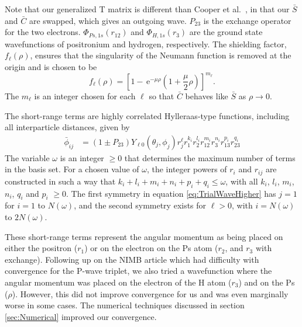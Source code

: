 \documentclass[preprint,showpacs,preprintnumbers,amsmath,amssymb]{revtex4}
\newcommand{\ee} {\,\text{e}}
\begin{document}
Note that our generalized T matrix is different than Cooper et al.\ \cite{Cooper2010}, in that our $\bar{S}$ and $\bar{C}$ are swapped, which gives an outgoing wave.  $P_{23}$ is the exchange operator for the two electrons. $\Phi_{Ps,1s}\left(r_{12}\right)$ and $\Phi_{H,1s}\left(r_3\right)$ are the ground state wavefunctions of positronium and hydrogen, respectively. The shielding factor, $f_\ell(\rho)$, ensures that the singularity of the Neumann function is removed at the origin and is chosen to be
\begin{equation}
f_\ell(\rho) = \left[1 - \ee^{-\mu \rho} \left(1+\frac{\mu}{2}\rho\right)\right]^{m_\ell}.
\label{eq:PartialWaveShielding}
\end{equation}
The $m_\ell$ is an integer chosen for each $\ell$ so that $\bar{C}$ behaves like $\bar{S}$ as $\rho \rightarrow 0$.

The short-range terms are highly correlated Hylleraas-type functions, including all interparticle distances, given by
\begin{subequations}
\label{eq:PhiDef}
\begin{align}
\bar{\phi}_{ij} &= \left(1 \pm P_{23}\right) Y_{\ell 0}(\theta_j,\phi_j) r_j^{\ell} r_1^{k_i} r_2^{l_i} r_{12}^{m_i} r_3^{n_i} r_{13}^{p_i} r_{23}^{q_i} \label{eq:PartialWavePhi}
\end{align}
\end{subequations}
The variable $\omega$ is an integer $\geq 0$ that determines the maximum number of terms in the basis set.  For a chosen value of $\omega$, the integer powers of $r_i$ and $r_{ij}$ are constructed in such a way that $k_i + l_i + m_i + n_i + p_i + q_i \leq \omega$, with all $k_i$, $l_i$, $m_i$, $n_i$, $q_i$ and $p_i$ $\geq 0$. The first symmetry in equation \ref{eq:TrialWaveHigher} has $j = 1$ for $i=1$ to $N(\omega)$, and the second symmetry exists for $\ell > 0$, with $i = N(\omega)$ to $2N(\omega)$.

These short-range terms represent the angular momentum as being placed on either the positron ($r_1$) or on the electron on the Ps atom ($r_2$, and $r_3$ with exchange).
Following up on the NIMB article \cite{VanReeth2004} which had difficulty with convergence for the P-wave triplet, we also tried a wavefunction where the angular momentum was placed on the electron of the H atom ($r_3$) and on the Ps ($\rho$). However, this did not improve convergence for us and was even marginally worse in some cases. The numerical techniques discussed in section \ref{sec:Numerical} improved our convergence.
\end{document}
